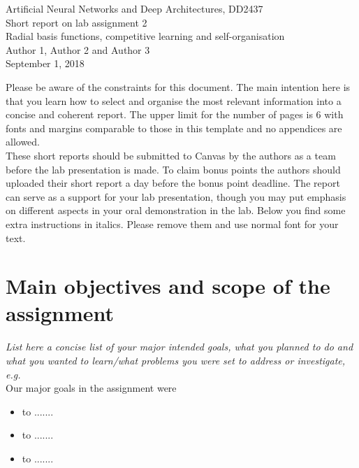 \documentclass[a4paper]{article}
\begin{document}
\begin{center}
  {\large Artificial Neural Networks and Deep Architectures, DD2437}\\
  \vspace{7mm}
  {\huge Short report on lab assignment 2\\[1ex]}
  {\Large Radial basis functions, competitive learning and self-organisation}\\
  \vspace{8mm}  
  {\Large Author 1, Author 2 and Author 3\\}
  \vspace{4mm}
  {\large September 1, 2018\\}
\end{center}

\begin{framed}
Please be aware of the constraints for this document. The main intention here is that you learn how to select and organise the most relevant information into a concise and coherent report. The upper limit for the number of pages is 6 with fonts and margins comparable to those in this template and no appendices are allowed. \\
These short reports should be submitted to Canvas by the authors as a team before the lab presentation is made. To claim bonus points the authors should uploaded their short report a day before the bonus point deadline. The report can serve as a support for your lab presentation, though you may put emphasis on different aspects in your oral demonstration in the lab.
Below you find some extra instructions in italics. Please remove them and use normal font for your text.
\end{framed}

\section{Main objectives and scope of the assignment}

\textit{List here a concise list of your major intended goals, what you planned to do and what you wanted to learn/what problems you were set to address or investigate, e.g.}\\
Our major goals in the assignment were  
\begin{itemize}
\item to .......
\item to .......
\item to ....... 
\end{itemize}
\end{document}
